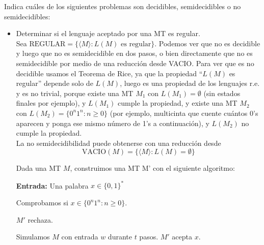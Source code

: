 \begin{ejercicio}
    Indica cuáles de los siguientes problemas son decidibles, semidecidibles o no semidecidibles:
    \begin{itemize}
        \item[a)] Determinar si el lenguaje aceptado por una MT es regular. \\ %
        
        Sea $\text{REGULAR} = \{ \langle M \rangle : L(M) \text{ es regular}\}$. Podemos ver que no es decidible y luego que 
        no es semidecidible en dos pasos, o bien directamente que no es semidecidible por medio de una reducción 
        desde VACIO. Para ver que es no decidible usamos el Teorema de Rice, ya que la propiedad ``$L(M)$ es regular'' 
        depende solo de $L(M)$, luego es una propiedad de los lenguajes r.e. y es no trivial, porque 
        existe una MT $M_1$ con $L(M_1) = \emptyset$ (sin estados finales por ejemplo), y $L(M_1)$  cumple la propiedad, 
        y existe una MT $M_2$ con $L(M_2) = \{0^n 1^n : n \geq 0\}$ (por ejemplo, multicinta que cuente cuántos 0's
        aparecen y ponga ese mismo número de 1's a continuación), y $L(M_2)$ no cumple la propiedad. \\

        La no semidecidibilidad puede obtenerse con una reducción desde 
        $$\text{VACIO}(M) = \{\langle M \rangle : L(M) = \emptyset\}$$

        Dada una MT $M$, construimos una MT M' con el siguiente algoritmo:

        \begin{algorithm}
            \caption{MT $M'$}
            \label{algorithm:regular-prima}
            \begin{algorithmic}
                \State \textbf{Entrada:} Una palabra $x \in \{0,1\}^{*}$

                \State Comprobamos si $x \in \{0^n1^n : n \geq 0\}$.

                    \State $M'$ rechaza.
                \EndIf

                        \State Simulamos $M$ con entrada $w$ durante $t$ pasos.
                            \State $M'$ acepta $x$.
                        \EndIf
                    \EndFor
                \EndFor
            \end{algorithmic}
        \end{algorithm}
        

\end{itemize}
\end{ejercicio}
